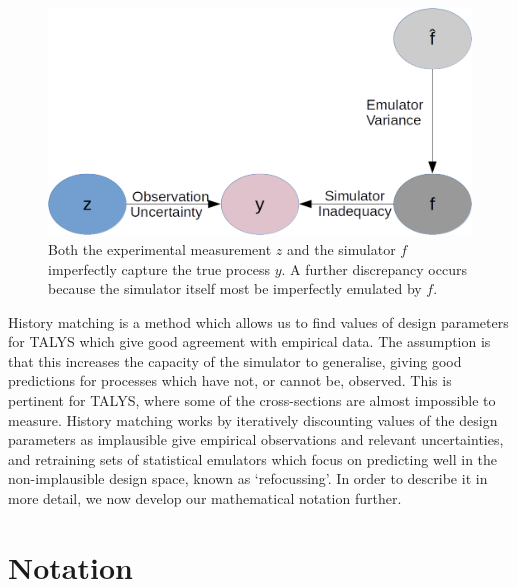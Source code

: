 \documentclass[
  12pt,
  a4paper,
  twoside]{book}
\begin{document}
\begin{figure}[H]

{\centering \includegraphics[width=0.8\linewidth]{figures/uncertanties_bigger} 

}

\caption{Both the experimental measurement $z$ and the simulator $f$ imperfectly capture the true process $y$. A further discrepancy occurs because the simulator itself most be imperfectly emulated by $f$.}\label{fig:uncertainty-sketch}
\end{figure}

History matching is a method which allows us to find values of design parameters for TALYS which give good agreement with empirical data. The assumption is that this increases the capacity of the simulator to generalise, giving good predictions for processes which have not, or cannot be, observed. This is pertinent for TALYS, where some of the cross-sections are almost impossible to measure. History matching works by iteratively discounting values of the design parameters as implausible give empirical observations and relevant uncertainties, and retraining sets of statistical emulators which focus on predicting well in the non-implausible design space, known as `refocussing'. In order to describe it in more detail, we now develop our mathematical notation further.

\hypertarget{Intro-notation}{%
\section{Notation}\label{Intro-notation}}
\end{document}
